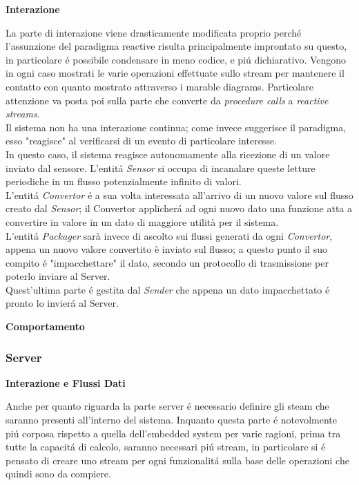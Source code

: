 \begin{center}
  \textbf{Interazione}
\end{center}

La parte di interazione viene drasticamente modificata proprio perch\'e l'assunzione del paradigma reactive risulta principalmente improntato su questo, in particolare \'e possibile condensare in meno codice, e pi\'u dichiarativo. Vengono in ogni caso mostrati le varie operazioni effettuate sullo stream per mantenere il contatto con quanto mostrato attraverso i marable diagrams. Particolare attenzione va posta poi sulla parte che converte da \textit{procedure calls} a \textit{reactive streams}. \\
Il sistema non ha una interazione continua; come invece suggerisce il paradigma, esso "reagisce" al verificarsi di un evento di particolare interesse.\\
In questo caso, il sistema reagisce autonomamente alla ricezione di un valore inviato dal sensore. L'entit\'a \textit{Sensor} si occupa di incanalare queste letture periodiche in un flusso potenzialmente infinito di valori.\\
L'entit\'a \textit{Convertor} \'e a sua volta interessata all'arrivo di un nuovo valore sul flusso creato dal \textit{Sensor}; il Convertor applicher\'a ad ogni nuovo dato una funzione atta a convertire in valore in un dato di maggiore utilità per il sistema.\\
L'entit\'a \textit{Packager} sarà invece di ascolto sui flussi generati da ogni \textit{Convertor}, appena un nuovo valore convertito è inviato sul flusso; a questo punto il suo compito \'e "impacchettare" il dato, secondo un protocollo di trasmissione per poterlo inviare al Server.\\
Quest'ultima parte \'e gestita dal \textit{Sender} che appena un dato impacchettato \'e pronto lo invier\'a al Server.

\begin{center}
\textbf{Comportamento}
\end{center}

\subsubsection{Server}

\begin{center}
  \textbf{Interazione e Flussi Dati}
\end{center}

Anche per quanto riguarda la parte server \'e necessario definire gli steam che saranno presenti all'interno del sistema. Inquanto questa parte \'e notevolmente pi\'u corposa rispetto a quella dell'embedded system per varie ragioni, prima tra tutte la capacit\'a di calcolo, saranno necessari pi\'u stream, in particolare si \'e pensato di creare uno stream per ogni funzionalit\'a sulla base delle operazioni che quindi sono da compiere.

